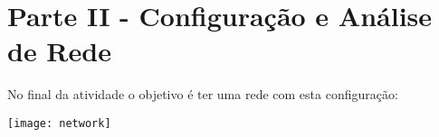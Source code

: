 \section*{Parte II - Configuração e Análise de Rede}
No final da atividade o objetivo é ter uma rede com esta configuração:
\begin{center}
	\texttt{[image: network]}                                                      
\end{center}












